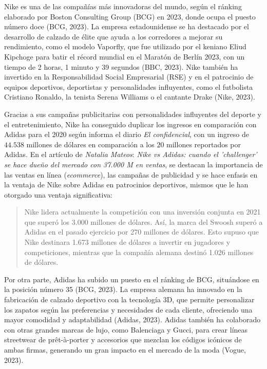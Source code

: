 \documentclass[a4paper,12pt]{article}
\begin{document}
Nike es una de las compañías más innovadoras del mundo, según el ránking elaborado por Boston Consulting Group (BCG) en 2023, donde ocupa el puesto número doce (BCG, 2023). La empresa estadounidense se ha destacado por el desarrollo de calzado de élite que ayuda a los corredores a mejorar su rendimiento, como el modelo Vaporfly, que fue utilizado por el keniano Eliud Kipchoge para batir el récord mundial en el Maratón de Berlín 2023, con un tiempo de 2 horas, 1 minuto y 39 segundos (BBC, 2023). Nike también ha invertido en la Responsabilidad Social Empresarial (RSE) y en el patrocinio de equipos deportivos, deportistas y personalidades influyentes, como el futbolista Cristiano Ronaldo, la tenista Serena Williams o el cantante Drake (Nike, 2023).\par

Gracias a sus campañas publicitarias con personalidades influyentes del deporte y el entretenimiento, Nike ha conseguido duplicar los ingresos en comparación con Adidas para el 2020 según informa el diario \emph{El confidencial}, con un ingreso de $44.538$ millones de dólares en comparación a los $20$ millones reportados por Adidas. En el artículo de \emph{Natalia Mateos}: \textit{Nike vs Adidas: cuando el 'challenger' se hace dueño del mercado con 37.000 M en ventas}, se destacan la importancia de las ventas en línea (\emph{ecommerce}), las campañas de publicidad y se hace enfasis en la ventaja de Nike sobre Adidas en patrocinios deportivos, mismos que le han otorgado una ventaja significativa:

\begin{quotation}
	Nike lidera actualmente la competición con una inversión conjunta en 2021 que superó los 3.000 millones de dólares. Así, la marca del Swoosh superó a Adidas en el pasado ejercicio por 270 millones de dólares. Esto supuso que Nike destinara 1.673 millones de dólares a invertir en jugadores y competiciones, mientras que la compañía alemana destinó 1.026 millones de dólares. 
\end{quotation}

Por otra parte, Adidas ha subido un puesto en el ránking de BCG, situándose en la posición número 35 (BCG, 2023). La empresa alemana ha innovado en la fabricación de calzado deportivo con la tecnología 3D, que permite personalizar los zapatos según las preferencias y necesidades de cada cliente, ofreciendo una mayor comodidad y adaptabilidad (Adidas, 2023). Adidas también ha colaborado con otras grandes marcas de lujo, como Balenciaga y Gucci, para crear líneas streetwear de prêt-à-porter y accesorios que mezclan los códigos icónicos de ambas firmas, generando un gran impacto en el mercado de la moda (Vogue, 2023).\par
\end{document}
